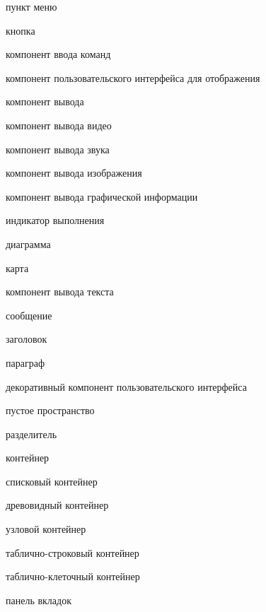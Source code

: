 \begin{textitemize}
\begin{textitemize}
\begin{textitemize}
\begin{textitemize}
				\item пункт меню
				\item кнопка
			\end{textitemize}
			\item компонент ввода команд
		\end{textitemize}
	\end{textitemize}
	\item компонент пользовательского интерфейса для отображения
	\begin{textitemize}
		\item компонент вывода
		\begin{textitemize}
			\item компонент вывода видео
			\item компонент вывода звука
			\item компонент вывода изображения
			\item компонент вывода графической информации
			\begin{textitemize}
				\item индикатор выполнения
				\item диаграмма
				\item карта
			\end{textitemize}
			\item компонент вывода текста
			\begin{textitemize}
				\item сообщение
				\item заголовок
				\item параграф
			\end{textitemize}
		\end{textitemize}
		\item декоративный компонент пользовательского интерфейса
		\begin{textitemize}
			\item пустое пространство
			\item разделитель
		\end{textitemize}
		\item контейнер
		\begin{textitemize}
			\item списковый контейнер
			\item древовидный контейнер
			\item узловой контейнер
			\item таблично-строковый контейнер
			\item таблично-клеточный контейнер
			\item панель вкладок

\end{textitemize}
\end{textitemize}
\end{textitemize}
